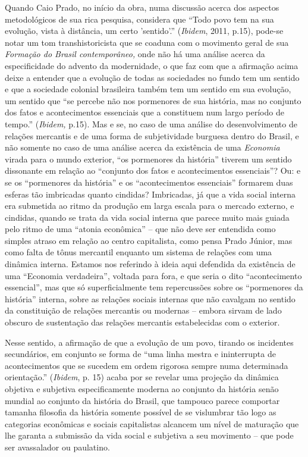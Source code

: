 Quando Caio Prado, no início da obra, numa discussão acerca dos aspectos
metodológicos de sua rica pesquisa, considera que ``Todo povo tem na sua
evolução, vista à distância, um certo 'sentido'.'' (\emph{Ibidem}, 2011,
p.15), pode-se notar um tom transhistoricista que se coaduna com o
movimento geral de sua \emph{Formação do Brasil contemporâneo,} onde não
há uma análise acerca da especificidade do advento da modernidade, o que
faz com que a afirmação acima deixe a entender que a evolução de todas
as sociedades no fundo tem um sentido e que a sociedade colonial
brasileira também tem um sentido em sua evolução, um sentido que ``se
percebe não nos pormenores de sua história, mas no conjunto dos fatos e
acontecimentos essenciais que a constituem num largo período de tempo.''
(\emph{Ibidem,} p.15). Mas e se, no caso de uma análise do
desenvolvimento de relações mercantis e de uma forma de subjetividade
burguesa dentro do Brasil, e não somente no caso de uma análise acerca
da existência de uma \emph{Economia} virada para o mundo exterior, ``os
pormenores da história'' tiverem um sentido dissonante em relação ao
``conjunto dos fatos e acontecimentos essenciais''? Ou: e se os
``pormenores da história'' e os ``acontecimentos essenciais'' formarem
duas esferas tão imbricadas quanto cindidas? Imbricadas, já que a vida
social interna era submetida ao ritmo da produção em larga escala para o
mercado externo, e cindidas, quando se trata da vida social interna que
parece muito mais guiada pelo ritmo de uma ``atonia econômica'' -- que
não deve ser entendida como simples atraso em relação ao centro
capitalista, como pensa Prado Júnior, mas como falta de tônus mercantil
enquanto um sistema de relações com uma dinâmica interna. Estamos nos
referindo à ideia aqui defendida da existência de uma ``Economia
verdadeira'', voltada para fora, e que seria o dito ``acontecimento
essencial'', mas que só superficialmente tem repercussões sobre os
``pormenores da história'' interna, sobre as relações sociais internas
que não cavalgam no sentido da constituição de relações mercantis ou
modernas -- embora sirvam de lado obscuro de sustentação das relações
mercantis estabelecidas com o exterior.

Nesse sentido, a afirmação de que a evolução de um povo, tirando os
incidentes secundários, em conjunto se forma de ``uma linha mestra e
ininterrupta de acontecimentos que se sucedem em ordem rigorosa sempre
numa determinada orientação.'' (\emph{Ibidem}, p. 15) acaba por se
revelar uma projeção da dinâmica objetiva e subjetiva especificamente
moderna ao conjunto da história senão mundial ao conjunto da história do
Brasil, que tampouco parece comportar tamanha filosofia da história
somente possível de se vislumbrar tão logo as categorias econômicas e
sociais capitalistas alcancem um nível de maturação que lhe garanta a
submissão da vida social e subjetiva a seu movimento -- que pode ser
avassalador ou paulatino.

